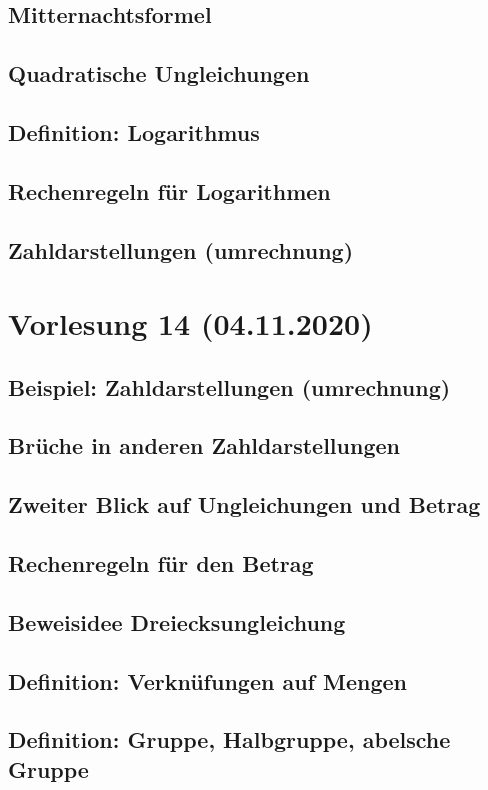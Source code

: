 \documentclass[]{article}
\begin{document}
\subsection{Mitternachtsformel}
\subsection{Quadratische Ungleichungen}
\subsection{Definition: Logarithmus}
\subsection{Rechenregeln für Logarithmen}
\subsection{Zahldarstellungen (umrechnung)}


\section{Vorlesung 14 (04.11.2020)}
\subsection{Beispiel: Zahldarstellungen (umrechnung)}
\subsection{Brüche in anderen Zahldarstellungen}
\subsection{Zweiter Blick auf Ungleichungen und Betrag}
\subsection{Rechenregeln für den Betrag}
\subsection{Beweisidee Dreiecksungleichung}
\subsection{Definition: Verknüfungen auf Mengen}
\subsection{Definition: Gruppe, Halbgruppe, abelsche Gruppe}
\end{document}

